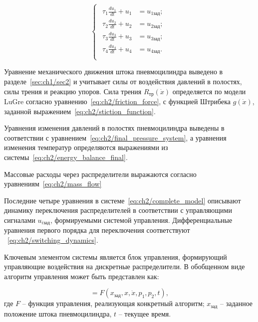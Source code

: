 \begin{equation}
\begin{cases}
\begin{aligned}
			\tau_1 \frac{du_1}{dt} + u_1 & = u_{1\text{зад}};                                                                                               \\
			\tau_2 \frac{du_2}{dt} + u_2 & = u_{2\text{зад}};                                                                                               \\
			\tau_3 \frac{du_3}{dt} + u_3 & = u_{3\text{зад}};                                                                                              \\
			\tau_4 \frac{du_4}{dt} + u_4 & = u_{4\text{зад}}.                                                                                               \\
		\end{aligned}
	\end{cases}
	\label{eq:ch2/complete_model}
\end{equation}

Уравнение механического движения штока пневмоцилиндра выведено в разделе~\ref{sec:ch1/sec2} и учитывает силы от
воздействия давлений в полостях, силы трения и реакцию упоров. Сила трения $R_\text{тр}(\dot{x})$ определяется
по модели LuGre согласно уравнению~\eqref{eq:ch2/friction_force},
с функцией Штрибека $g(\dot{x})$, заданной выражением~\eqref{eq:ch2/stiction_function}.

Уравнения изменения давлений в полостях пневмоцилиндра выведены в соответствии с уравнением~\eqref{eq:ch2/final_pressure_system}, а уравнения изменения
температур определяются выражениями из системы~\eqref{eq:ch2/energy_balance_final}.

Массовые расходы через распределители выражаются согласно уравнениям~\eqref{eq:ch2/mass_flow}

Последние четыре уравнения в системе~\eqref{eq:ch2/complete_model} описывают динамику переключения распределителей в соответствии с управляющими сигналами $u_{i\text{зад}}$,
формируемыми системой управления. Дифференциальные уравнения первого порядка для переключения соответствуют ~\eqref{eq:ch2/switching_dynamics}.

Ключевым элементом системы является блок управления, формирующий управляющие
воздействия на дискретные распределители. В обобщенном виде алгоритм управления может быть представлен как:

\begin{equation}
	[u_{1\text{зад}}, u_{2\text{зад}}, u_{3\text{зад}}, u_{4\text{зад}}] = F(x_\text{зад}, x, \dot{x}, p_1, p_2, t),
	\label{eq:ch2/control_generic}
\end{equation}
где $F$ -- функция управления, реализующая конкретный алгоритм;
$x_\text{зад}$ -- заданное положение штока пневмоцилиндра, $t$ -- текущее время.

